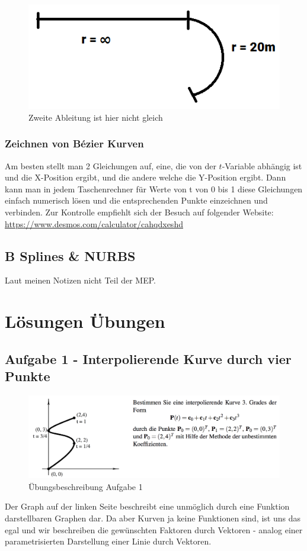 \begin{figure}[!ht]
	\centering
	\includegraphics[width=0.2\linewidth]{fig/c2_stetigkeit}
	\caption{Zweite Ableitung ist hier nicht gleich}
	\label{fig:c2_stetigkeit}
\end{figure}
\subsubsection{Zeichnen von Bézier Kurven}
Am besten stellt man 2 Gleichungen auf, eine, die von der \(t\)-Variable abhängig ist und die X-Position ergibt, und die andere welche die Y-Position ergibt. Dann kann man in jedem Taschenrechner für Werte von t von 0 bis 1 diese Gleichungen einfach numerisch lösen und die entsprechenden Punkte einzeichnen und verbinden. Zur Kontrolle empfiehlt sich der Besuch auf folgender Website: \url{https://www.desmos.com/calculator/cahqdxeshd}
\subsection{B Splines \& NURBS}
Laut meinen Notizen nicht Teil der MEP.
\section{Lösungen Übungen}
\subsection{Aufgabe 1 - Interpolierende Kurve durch vier Punkte}
\begin{figure}[!ht]
	\centering
	\includegraphics[width=1.0\linewidth]{fig/ueb_curves_1}
	\caption{Übungsbeschreibung Aufgabe 1}
\end{figure}
Der Graph auf der linken Seite beschreibt eine unmöglich durch eine Funktion darstellbaren Graphen dar. Da aber Kurven ja keine Funktionen sind, ist uns das egal und wir beschreiben die gewünschten Faktoren durch Vektoren - analog einer parametrisierten Darstellung einer Linie durch Vektoren.\\ \newline

